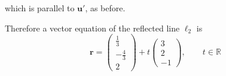 \documentclass[leqno]{article}
\begin{document}
\begin{enumerate}[
  label=\textbf{\arabic*.},
  leftmargin=*,
  topsep=0pt,
  partopsep=0pt,
  parsep=0pt
]
\begin{djsSolution}
{which is parallel to \(\mathbf u'\), as before.
\par}

\vspace{8pt}
Therefore a vector equation of the reflected line \(\ell_2\) is
\[
\mathbf r=
\begin{pmatrix}\frac13\\-\frac43\\2\end{pmatrix}
+t\begin{pmatrix}3\\2\\-1\end{pmatrix},
\qquad t\in\mathbb{R}
\]
\end{djsSolution}


\end{enumerate}
\end{document}
